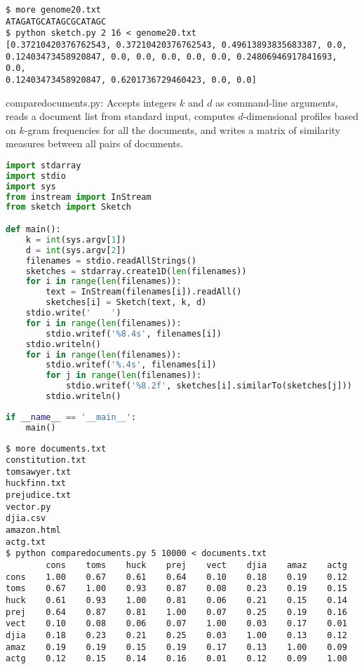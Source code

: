 \documentclass[8pt,a4paper,compress,handout]{beamer}
\begin{document}
\begin{frame}[fragile]
\begin{lstlisting}[language={}]
$ more genome20.txt
ATAGATGCATAGCGCATAGC
$ python sketch.py 2 16 < genome20.txt 
[0.37210420376762543, 0.37210420376762543, 0.49613893835683387, 0.0, 
0.12403473458920847, 0.0, 0.0, 0.0, 0.0, 0.0, 0.24806946917841693, 0.0, 
0.12403473458920847, 0.6201736729460423, 0.0, 0.0]
\end{lstlisting}
\end{frame}

\begin{frame}[fragile]
\begin{framed}
\tiny comparedocuments.py: Accepts integers $k$ and $d$ as command-line arguments, reads a document list from standard input, computes $d$-dimensional profiles based on $k$-gram frequencies for all the documents, and writes a matrix of similarity measures between all pairs of documents.
\end{framed}

\begin{lstlisting}[language=Python]
import stdarray
import stdio
import sys
from instream import InStream
from sketch import Sketch

def main():
    k = int(sys.argv[1])
    d = int(sys.argv[2])
    filenames = stdio.readAllStrings()
    sketches = stdarray.create1D(len(filenames))
    for i in range(len(filenames)):
        text = InStream(filenames[i]).readAll()
        sketches[i] = Sketch(text, k, d)
    stdio.write('    ')
    for i in range(len(filenames)):
        stdio.writef('%8.4s', filenames[i])
    stdio.writeln()
    for i in range(len(filenames)):
        stdio.writef('%.4s', filenames[i])
        for j in range(len(filenames)):
            stdio.writef('%8.2f', sketches[i].similarTo(sketches[j]))
        stdio.writeln()
    
if __name__ == '__main__':
    main()
\end{lstlisting}
\end{frame}

\begin{frame}[fragile]
\begin{lstlisting}[language={}]
$ more documents.txt
constitution.txt
tomsawyer.txt
huckfinn.txt
prejudice.txt
vector.py
djia.csv
amazon.html
actg.txt
$ python comparedocuments.py 5 10000 < documents.txt
        cons    toms    huck    prej    vect    djia    amaz    actg
cons    1.00    0.67    0.61    0.64    0.10    0.18    0.19    0.12
toms    0.67    1.00    0.93    0.87    0.08    0.23    0.19    0.15
huck    0.61    0.93    1.00    0.81    0.06    0.21    0.15    0.14
prej    0.64    0.87    0.81    1.00    0.07    0.25    0.19    0.16
vect    0.10    0.08    0.06    0.07    1.00    0.03    0.17    0.01
djia    0.18    0.23    0.21    0.25    0.03    1.00    0.13    0.12
amaz    0.19    0.19    0.15    0.19    0.17    0.13    1.00    0.09
actg    0.12    0.15    0.14    0.16    0.01    0.12    0.09    1.00
\end{lstlisting}
\end{frame}
\end{document}
